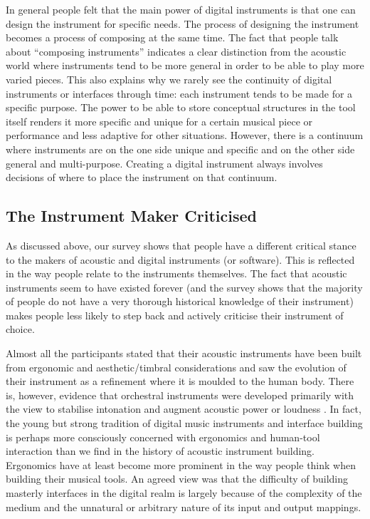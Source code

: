 In general people felt that the main power of digital instruments is that one
can design the instrument for specific needs. The process of designing the
instrument becomes a process of composing at the same time. The fact that people
talk about ``composing instruments'' \cite{Momeni:2005} indicates a clear distinction from the
acoustic world where instruments tend to be more general in order to be able to
play more varied pieces. This also explains why we rarely see the continuity of
digital instruments or interfaces through time: each instrument tends to be made
for a specific purpose. The power to be able to store conceptual structures in
the tool itself renders it more specific and unique for a certain musical piece
or performance and less adaptive for other situations. However, there is a
continuum where instruments are on the one side unique and specific and on the
other side general and multi-purpose. Creating a digital instrument always
involves decisions of where to place the instrument on that continuum.

\subsection{The Instrument Maker Criticised}
As discussed above, our survey shows that people have a different critical stance to the makers of acoustic and digital instruments (or software). This is reflected in the way people relate to the instruments themselves. The fact that acoustic instruments seem to have existed forever (and the survey shows that the majority of people do not have a very thorough historical knowledge of their instrument) makes people less likely to step back and actively criticise their instrument of choice.

Almost all the participants stated that their acoustic
instruments have been built from ergonomic and aesthetic/timbral considerations
and saw the evolution of their instrument as a refinement where it is moulded to
the human body. There is, however, evidence that orchestral instruments were
developed primarily with the view to stabilise intonation and augment acoustic
power or loudness \cite{Jorda:2005}. In fact, the young but strong tradition of digital music
instruments and interface building is perhaps more consciously concerned with
ergonomics and human-tool interaction than we find in the history of acoustic
instrument building. Ergonomics have at least become more prominent in the way
people think when building their musical tools. An agreed view was that the
difficulty of building masterly interfaces in the digital realm is largely
because of the complexity of the medium and the unnatural or arbitrary nature of
its input and output mappings.

